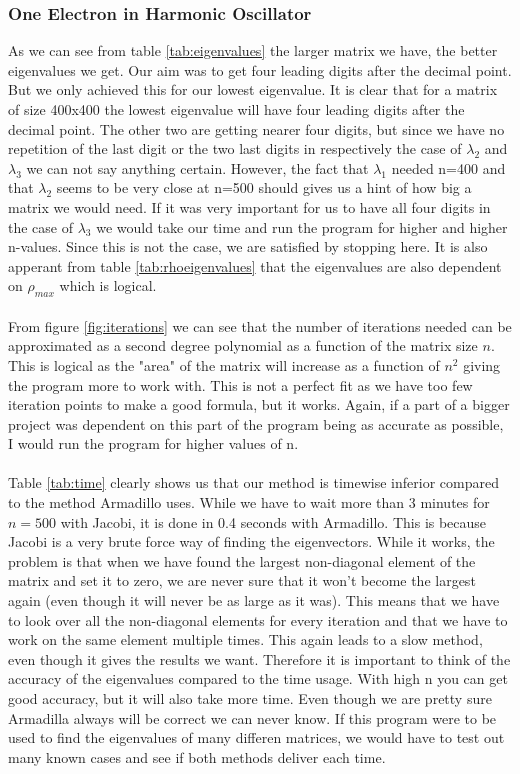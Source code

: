\documentclass{article}
\begin{document}
\subsubsection{One Electron in Harmonic Oscillator}
As we can see from table \ref{tab:eigenvalues} the larger matrix we have, the better eigenvalues we get. Our aim was to get four leading digits after the decimal point. But we only achieved this for our lowest eigenvalue. It is clear that for a matrix of size 400x400 the lowest eigenvalue will have four leading digits after the decimal point. The other two are getting nearer four digits, but since we have no repetition of the last digit or the two last digits in respectively the case of $\lambda_2$ and $\lambda_3$ we can not say anything certain. However, the fact that $\lambda_1$ needed n=400 and that $\lambda_2$ seems to be very close at n=500 should gives us a hint of how big a matrix we would need. If it was very important for us to have all four digits in the case of $\lambda_3$ we would take our time and run the program for higher and higher n-values. Since this is not the case, we are satisfied by stopping here.
It is also apperant from table \ref{tab:rhoeigenvalues} that the eigenvalues are also dependent on $\rho_{max}$ which is logical.\\ \\
From figure \ref{fig:iterations} we can see that the number of iterations needed can be approximated as a second degree polynomial as a function of the matrix size $n$. This is logical as the "area" of the matrix will increase as a function of $n^2$ giving the program more to work with. This is not a perfect fit as we have too few iteration points to make a good formula, but it works. Again, if a part of a bigger project was dependent on this part of the program being as accurate as possible, I would run the program for higher values of n. \\ \\
Table \ref{tab:time} clearly shows us that our method is timewise inferior compared to the method Armadillo uses. While we have to wait more than 3 minutes for $n = 500$ with Jacobi, it is done in 0.4 seconds with Armadillo. This is because Jacobi is a very brute force way of finding the eigenvectors. While it works, the problem is that when we have found the largest non-diagonal element of the matrix and set it to zero, we are never sure that it won't become the largest again (even though it will never be as large as it was). This means that we have to look over all the non-diagonal elements for every iteration and that we have to work on the same element multiple times. This again leads to a slow method, even though it gives the results we want. Therefore it is important to think of the accuracy of the eigenvalues compared to the time usage. With high n you can get good accuracy, but it will also take more time. Even though we are pretty sure Armadilla always will be correct we can never know. If this program were to be used to find the eigenvalues of many differen matrices, we would have to test out many known cases and see if both methods deliver each time.
\end{document}
